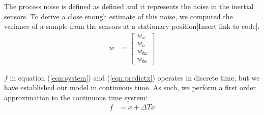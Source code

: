 \documentclass[]{article}
\begin{document}
{The process noise is defined as defined and it represents the noise in the inertial sensors. To derive a close enough estimate of this noise, we computed the variance of a sample from the sensors at a stationary position[Insert link to code].
\begin{align}
	w &= 
	\left[
	\begin{matrix}
		w_\omega \\
		w_a \\
		w_{b\omega} \\
		w_{ba}
	\end{matrix}
	\right]
\end{align}

$f$ in equation (\ref{eqn:system}) and (\ref{eqn:predictx}) operates in discrete time, but we have established our model in continuous time. As such, we perform a first order approximation to the continuous time system:
\begin{align}
	f &= x + \Delta T \dot{x}
	\label{eqn:descrete_f}
\end{align}

}
\end{document}
